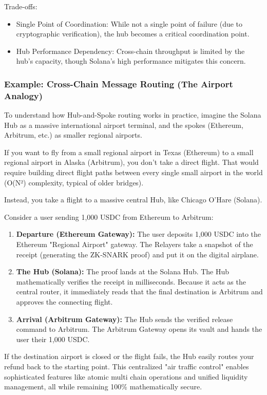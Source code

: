\documentclass[11pt,a4paper]{article}
\begin{document}
Trade-offs:
\begin{itemize}
    \item Single Point of Coordination: While not a single point of failure (due to cryptographic verification), the hub becomes a critical coordination point.
    \item Hub Performance Dependency: Cross-chain throughput is limited by the hub's capacity, though Solana's high performance mitigates this concern.
\end{itemize}

\subsubsection{Example: Cross-Chain Message Routing (The Airport Analogy)}
To understand how Hub-and-Spoke routing works in practice, imagine the Solana Hub as a massive international airport terminal, and the spokes (Ethereum, Arbitrum, etc.) as smaller regional airports. 

If you want to fly from a small regional airport in Texas (Ethereum) to a small regional airport in Alaska (Arbitrum), you don't take a direct flight. That would require building direct flight paths between every single small airport in the world (O(N²) complexity, typical of older bridges). 

Instead, you take a flight to a massive central Hub, like Chicago O'Hare (Solana). 

Consider a user sending 1,000 USDC from Ethereum to Arbitrum:
\begin{enumerate}
    \item \textbf{Departure (Ethereum Gateway):} The user deposits 1,000 USDC into the Ethereum "Regional Airport" gateway. The Relayers take a snapshot of the receipt (generating the ZK-SNARK proof) and put it on the digital airplane.
    \item \textbf{The Hub (Solana):} The proof lands at the Solana Hub. The Hub mathematically verifies the receipt in milliseconds. Because it acts as the central router, it immediately reads that the final destination is Arbitrum and approves the connecting flight.
    \item \textbf{Arrival (Arbitrum Gateway):} The Hub sends the verified release command to Arbitrum. The Arbitrum Gateway opens its vault and hands the user their 1,000 USDC.
\end{enumerate}

If the destination airport is closed or the flight fails, the Hub easily routes your refund back to the starting point. This centralized "air traffic control" enables sophisticated features like atomic multi chain operations and unified liquidity management, all while remaining 100\% mathematically secure.
\end{document}

